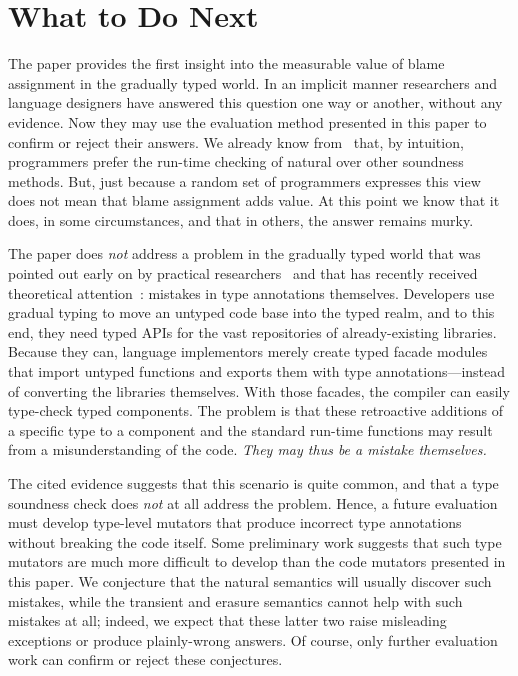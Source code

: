 \section{What to Do Next} \label{sec:conclusion}

The paper provides the first insight into the measurable value of blame
assignment in the gradually typed world. In an implicit manner researchers and
language designers have answered this question one way or another, without any
evidence. Now they may use the evaluation method presented in this paper to
confirm or reject their answers. We already know from~\citet{tgpk-dls-2018}
that, by intuition, programmers prefer the run-time checking of natural over
other soundness methods. But, just because a random set of programmers expresses
this view does not mean that blame assignment adds value. At this point we know
that it does, in some circumstances, and that in others, the answer remains
murky.

The paper does {\em not\/} address a problem in the gradually typed world that
was pointed out early on by practical researchers~\cite{incorrect-ts,
sta-nt-base-types, wmwz-ecoop-2017} and that has recently received theoretical
attention~\cite{gfd-oopsla-2019}: mistakes in type annotations themselves.
Developers use gradual typing to move an untyped code base into the typed realm,
and to this end, they need typed APIs for the vast repositories of
already-existing libraries. Because they can, language implementors merely
create typed facade modules that import untyped functions and exports them with
type annotations---instead of converting the libraries themselves. With those
facades, the compiler can easily type-check typed components. The problem is
that these retroactive additions of a specific type to a component and the
standard run-time functions may result from a misunderstanding of the
code. \emph{They may thus be a mistake themselves.}

The cited evidence suggests that this scenario is quite common, and that a type
soundness check does {\em not\/} at all address the problem.  Hence, a future
evaluation must develop type-level mutators that produce incorrect type
annotations without breaking the code itself. Some preliminary work suggests
that such type mutators are much more difficult to develop than the code
mutators presented in this paper. We conjecture that the natural semantics will
usually discover such mistakes, while the transient and erasure semantics cannot
help with such mistakes at all; indeed, we expect that these latter two raise
misleading exceptions or produce plainly-wrong answers.  Of course, only further
evaluation work can confirm or reject these conjectures.



